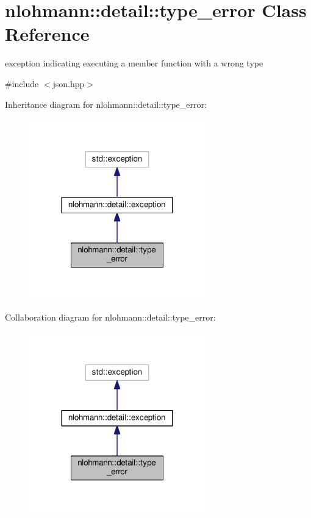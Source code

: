 \hypertarget{classnlohmann_1_1detail_1_1type__error}{}\section{nlohmann\+:\+:detail\+:\+:type\+\_\+error Class Reference}
\label{classnlohmann_1_1detail_1_1type__error}


exception indicating executing a member function with a wrong type  




{\ttfamily \#include $<$json.\+hpp$>$}



Inheritance diagram for nlohmann\+:\+:detail\+:\+:type\+\_\+error\+:\nopagebreak
\begin{figure}[H]
\begin{center}
\leavevmode
\includegraphics[width=216pt]{classnlohmann_1_1detail_1_1type__error__inherit__graph}
\end{center}
\end{figure}


Collaboration diagram for nlohmann\+:\+:detail\+:\+:type\+\_\+error\+:\nopagebreak
\begin{figure}[H]
\begin{center}
\leavevmode
\includegraphics[width=216pt]{classnlohmann_1_1detail_1_1type__error__coll__graph}
\end{center}
\end{figure}
